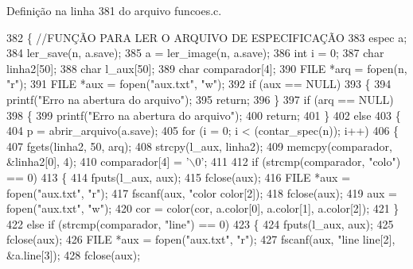 Definição na linha 381 do arquivo funcoes.\+c.


\begin{DoxyCode}
382 \{ \textcolor{comment}{//FUNÇÃO PARA LER O ARQUIVO DE ESPECIFICAÇÃO}
383     espec a;
384     ler_save(n, a.save);
385     a = ler_image(n, a.save);
386     \textcolor{keywordtype}{int} i = 0;
387     \textcolor{keywordtype}{char} linha2[50];
388     \textcolor{keywordtype}{char} l\_aux[50];
389     \textcolor{keywordtype}{char} comparador[4];
390     FILE *arq = fopen(n, \textcolor{stringliteral}{"r"});
391     FILE *aux = fopen(\textcolor{stringliteral}{"aux.txt"}, \textcolor{stringliteral}{"w"});
392     \textcolor{keywordflow}{if} (aux == NULL)
393     \{
394         printf(\textcolor{stringliteral}{"Erro na abertura do arquivo"});
395         \textcolor{keywordflow}{return};
396     \}
397     \textcolor{keywordflow}{if} (arq == NULL)
398     \{
399         printf(\textcolor{stringliteral}{"Erro na abertura do arquivo"});
400         \textcolor{keywordflow}{return};
401     \}
402     \textcolor{keywordflow}{else}
403     \{
404         p = abrir_arquivo(a.save);
405         \textcolor{keywordflow}{for} (i = 0; i < (contar_spec(n)); i++)
406         \{
407             fgets(linha2, 50, arq);
408             strcpy(l\_aux, linha2);
409             memcpy(comparador, &linha2[0], 4);
410             comparador[4] = \textcolor{charliteral}{'\(\backslash\)0'};
411 
412             \textcolor{keywordflow}{if} (strcmp(comparador, \textcolor{stringliteral}{"colo"}) == 0)
413             \{
414                 fputs(l\_aux, aux);
415                 fclose(aux);
416                 FILE *aux = fopen(\textcolor{stringliteral}{"aux.txt"}, \textcolor{stringliteral}{"r"});
417                 fscanf(aux, \textcolor{stringliteral}{"color %
      color[2]);
418                 fclose(aux);
419                 aux = fopen(\textcolor{stringliteral}{"aux.txt"}, \textcolor{stringliteral}{"w"});
420                 cor = color(cor, a.color[0], a.color[1], a.color[2]);
421             \}
422             \textcolor{keywordflow}{else} \textcolor{keywordflow}{if} (strcmp(comparador, \textcolor{stringliteral}{"line"}) == 0)
423             \{
424                 fputs(l\_aux, aux);
425                 fclose(aux);
426                 FILE *aux = fopen(\textcolor{stringliteral}{"aux.txt"}, \textcolor{stringliteral}{"r"});
427                 fscanf(aux, \textcolor{stringliteral}{"line %
      line[2], &a.line[3]);
428                 fclose(aux);
}}
\end{DoxyCode}
